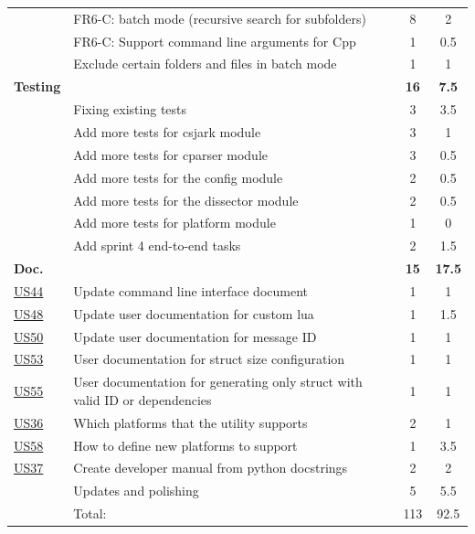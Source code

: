 \begin{table}[!htbp]
\begin{tabularx}{\textwidth}{l X c c}
	 & FR6-C: \Gls{batch mode} (recursive search for subfolders) &  8  & 2 \\
	 & FR6-C: Support command line arguments for Cpp & 1 & 0.5\\
	 & Exclude certain folders and files in batch mode & 1 & 1 \\
	\addlinespace
	\textbf{Testing} &  & \textbf{16} & \textbf{7.5} \\
	 & Fixing existing tests & 3 & 3.5 \\
	 & Add more tests for csjark module & 3 & 1 \\
	 & Add more tests for cparser module & 3 & 0.5 \\
	 & Add more tests for the config module & 2 & 0.5 \\
	 & Add more tests for the dissector module & 2 & 0.5 \\
	 & Add more tests for platform module & 1 & 0 \\
	 & Add sprint 4 end-to-end tasks & 2 & 1.5 \\
	\addlinespace
	\textbf{Doc.} &  & \textbf{15} & \textbf{17.5} \\
	\hyperref[tab:req:stories10]{US44} & Update command line interface document & 1 & 1 \\
	\hyperref[tab:req:stories11]{US48} & Update user documentation for custom \Gls{lua} & 1 & 1.5 \\
	\hyperref[tab:req:stories12]{US50} & Update user documentation for message ID & 1 & 1 \\
	\hyperref[tab:req:stories12]{US53} & User documentation for \gls{struct} size configuration & 1 & 1 \\
	\hyperref[tab:req:stories12]{US55} & User documentation for generating only \gls{struct} with valid ID or dependencies & 1 & 1 \\
	\hyperref[tab:req:stories9]{US36} & Which platforms that the \gls{utility} supports & 2 & 1 \\
	\hyperref[tab:req:stories13]{US58} & How to define new platforms to support & 1 & 3.5 \\
	\hyperref[tab:req:stories9]{US37} & Create developer manual from python docstrings & 2 & 2 \\
	& Updates and polishing & 5 & 5.5 \\
	\midrule
	& Total: & 113 & 92.5 \\
	\bottomrule
\end{tabularx}
\end{table}

